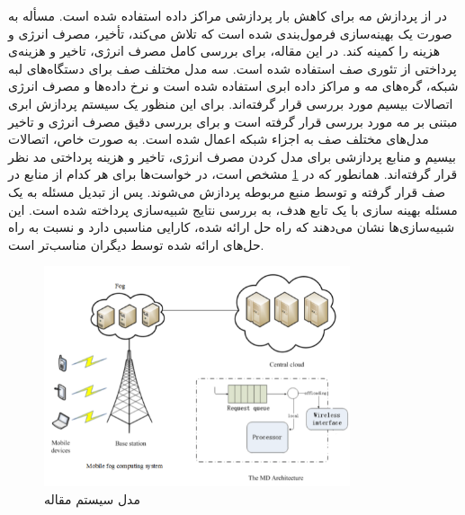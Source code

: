     در \cite{liu2017multiobjective} از پردازش مه برای کاهش بار پردازشی مراکز داده استفاده شده است.
    مسأله به صورت یک بهینه‌سازی فرمول‌بندی شده است که تلاش می‌کند، تأخیر، مصرف انرژی و هزینه را کمینه کند.
    در این مقاله، برای بررسی کامل مصرف انرژی، تاخیر و هزینه‌ی پرداختی از تئوری صف استفاده شده است.
    سه مدل مختلف صف برای دستگاه‌های لبه شبکه، گره‌های مه و مراکز داده ابری استفاده شده است و نرخ داده‌ها و مصرف انرژی اتصالات بیسیم مورد بررسی قرار گرفته‌اند.
    برای این منظور یک سیستم پردازش ابری مبتنی بر مه مورد بررسی قرار گرفته است و برای بررسی دقیق مصرف انرژی و تاخیر مدل‌های مختلف صف به اجزاء شبکه اعمال شده است.
    به صورت خاص، اتصالات بیسیم و منابع پردازشی برای مدل کردن مصرف انرژی، تاخیر و هزینه پرداختی مد نظر قرار گرفته‌اند.
    همانطور که در \cref{fig:chapter_2:system_model_liu2017multiobjective} مشخص است، در خواست‌ها برای هر کدام از منابع در صف قرار گرفته و توسط منبع مربوطه پردازش می‌شوند.
    پس از تبدیل مسئله به یک مسئله بهینه سازی با یک تابع هدف، به بررسی نتایج شبیه‌سازی پرداخته شده است.
    این شبیه‌سازی‌ها نشان می‌دهند که راه حل ارائه شده، کارایی مناسبی دارد و نسبت به راه حل‌های ارائه شده توسط دیگران مناسب‌تر است.

    \begin{figure}[h]
      \centerline{\includegraphics[width=9cm]{graphics/chapter_2/system_model_liu2017multiobjective}}
      \caption{مدل سیستم مقاله \cite{liu2017multiobjective}}
      \label{fig:chapter_2:system_model_liu2017multiobjective}
    \end{figure}

